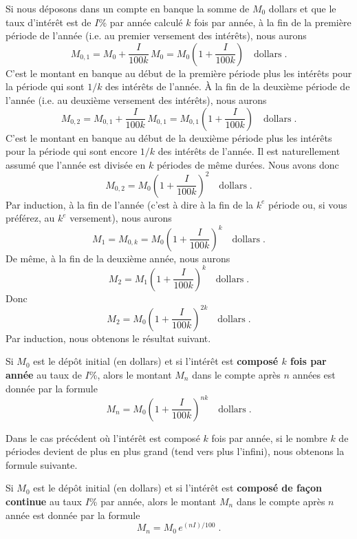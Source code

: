 {Si nous déposons dans un compte en banque la somme de $M_0$ dollars et que le
taux d'intérêt est de $I$\% par année calculé $k$ fois par année, à la fin
de la première période de l'année (i.e. au premier versement des intérêts),
nous aurons
\[
M_{0,1} = M_0+\frac{I}{100k}\,M_0 = M_0\left(1+\frac{I}{100k}\right)
\quad \text{dollars}\; .
\]
C'est le montant en banque au début de la première période plus les intérêts
pour la période qui sont $1/k$ des intérêts de l'année.  À la fin de la
deuxième période de l'année (i.e. au deuxième versement des intérêts), nous
aurons
\[
M_{0,2} = M_{0,1}+\frac{I}{100k}\,M_{0,1}
= M_{0,1}\left(1+\frac{I}{100k}\right)
\quad \text{dollars}\; .
\]
C'est le montant en banque au début de la deuxième période plus les intérêts
pour la période qui sont encore $1/k$ des intérêts de l'année.  Il est
naturellement assumé que l'année est divisée en $k$ périodes de même durées.
Nous avons donc
\[
M_{0,2} = M_0\left(1+\frac{I}{100k}\right)^2 \quad  \text{dollars}\; .
\]
Par induction, à la fin de l'année (c'est à dire à la fin de la $k^e$
période ou, si vous préférez, au $k^e$ versement), nous aurons
\[
M_1 = M_{0,k} = M_0\left(1+\frac{I}{100k}\right)^k \quad
\text{dollars}\; .
\]
De même, à la fin de la deuxième année, nous aurons
\[
M_2 = M_1\left(1+\frac{I}{100k}\right)^k \quad
\text{dollars}\; .
\]
Donc
\[
M_2 = M_0\left(1+\frac{I}{100k}\right)^{2k} \quad
\text{dollars}\; .
\]
Par induction, nous obtenons le résultat suivant.

\begin{meth} 
Si $M_0$ est le dépôt initial (en dollars) et si l'intérêt est
{\bfseries composé $k$ fois par année} au taux de $I$\%, alors le
montant $M_n$ dans le compte après $n$ années est donnée par la formule
\[
M_n = M_0\left(1+\frac{I}{100k}\right)^{nk} \quad \text{dollars} \; .
\]
\end{meth}

Dans le cas précédent où l'intérêt est composé $k$ fois par année, si le
nombre $k$ de périodes devient de plus en plus grand (tend vers plus
l'infini), nous obtenons la formule suivante.

\begin{meth}  
Si $M_0$ est le dépôt initial (en dollars) et si l'intérêt est
{\bfseries composé de façon continue}
au taux $I$\% par année, alors le montant $M_n$ dans le compte après $n$
année est donnée par la formule
\begin{equation} \label{eco_cont}
M_n = M_0 \, e^{(nI)/100} \; .
\end{equation}
\end{meth}

}
